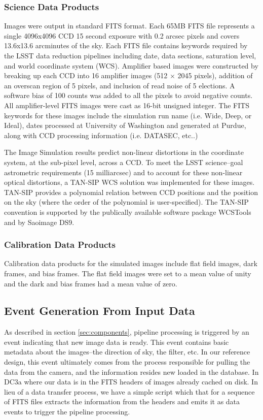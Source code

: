 \subsubsection{Science Data Products}

Images were output in standard FITS format. Each 65MB FITS file
represents a single 4096x4096 CCD 15 second exposure with 0.2 arcsec
pixels and covers 13.6x13.6 arcminutes of the sky. Each FITS file
contains keywords required by the LSST data reduction pipelines
including date, data sections, saturation level, and world coordinate
system (WCS).  Amplifier based images were constructed by breaking up
each CCD into 16 amplifier images (512 $\times$ 2045 pixels), addition
of an overscan region of 5 pixels, and inclusion of read noise of 5
elections.  A software bias of 100 counts was added to all the pixels
to avoid negative counts.  All amplifier-level FITS images were cast
as 16-bit unsigned integer. The FITS keywords for these images include
the simulation run name (i.e. Wide, Deep, or Ideal), dates processed
at University of Washington and generated at Purdue, along with CCD
processing information (i.e. DATASEC, etc..)

The Image Simulation results predict non-linear distortions in the
coordinate system, at the sub-pixel level, across a CCD. To meet the
LSST science--goal astrometric requirements (15 milliarcsec) and to
account for these non-linear optical distortions, a TAN-SIP WCS
solution was implemented for these images. TAN-SIP provides a
polynomial relation between CCD positions and the position on the sky
(where the order of the polynomial is user-specified). The TAN-SIP
convention is supported by the publically available software package
WCSTools and by Saoimage DS9. 

\subsubsection{Calibration Data Products}

Calibration data products for the simulated images include flat field
images, dark frames, and bias frames. The flat field images were set
to a mean value of unity and the dark and bias frames had a mean value
of zero.

\subsection{Event Generation From Input Data}

As described in section \ref{sec:components}, pipeline processing is
triggered by an event indicating that new image data is
ready.  This event contains basic metadata about the images--the
direction of sky, the filter, etc.  In our reference design, this
event ultimately comes from the process responsible for pulling the
data from the camera, and the information resides new loaded in the
database.  In DC3a where our data is in the FITS headers of images
already cached on disk.  In lieu of a data transfer process, we have a
simple script which that for a sequence of FITS files extracts the
information from the headers and emits it as data events to trigger
the pipeline processing.

